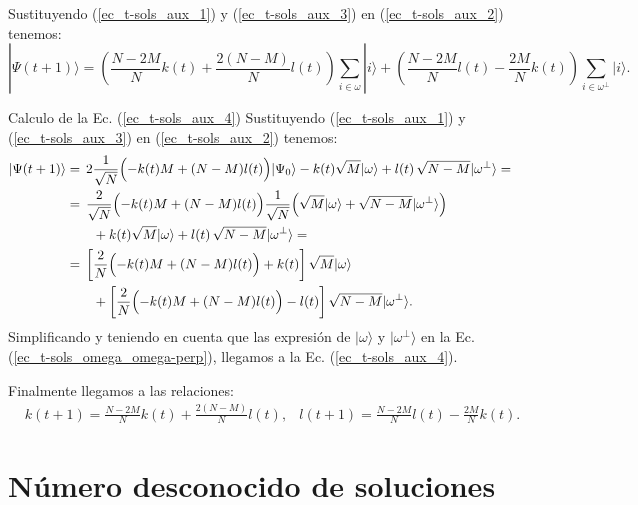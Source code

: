 \documentclass[a4paper,11pt]{article} %
\numberwithin{equation}{section}
\def\lp{\left(}
\def\rp{\right)}
\def\lc{\left[}
\def\rc{\right]}
\def\Lp{\Bigl(}
\def\Rp{\Bigr)}
\begin{document}
Sustituyendo (\ref{ec_t-sols_aux_1}) y (\ref{ec_t-sols_aux_3}) en (\ref{ec_t-sols_aux_2}) tenemos:
\begin{equation} \label{ec_t-sols_aux_4}
|\Psi(t+1) \rangle  = \lp \frac{N-2M}{N} k(t) + \frac{2(N-M)}{N} l(t) \rp \sum_{i \in \omega} | i \rangle + \lp \frac{N-2M}{N} l(t) - \frac{2M}{N} k(t) \rp \sum_{i \in \omega^{\perp}} | i \rangle.
\end{equation}
	
	\begin{mybox_green} {Calculo de la Ec. (\ref{ec_t-sols_aux_4})}
	Sustituyendo (\ref{ec_t-sols_aux_1}) y (\ref{ec_t-sols_aux_3}) en (\ref{ec_t-sols_aux_2}) tenemos:
	\begin{align*}
	|\Psi (t+1) \rangle & = 
	\, 2  \frac{1}{\sqrt{N}} \Lp -k(t) M + (N-M) l(t) \Rp | \Psi_0 \rangle 
	- k(t) \sqrt{M} |\omega \rangle +  l(t) \, \sqrt{N-M} | \omega^{\perp} \rangle  = \\
	& =  \, \frac{2}{\sqrt{N}} \Lp -k(t) M + (N-M) l(t) \Rp  \frac{1}{\sqrt{N}} \Lp \sqrt{M} | \omega \rangle + \sqrt{N-M} |\omega^{\perp} \rangle \Rp \\ 
	& \qquad + k(t) \sqrt{M} |\omega \rangle  +   l(t) \, \sqrt{N-M} | \omega^{\perp} \rangle = \\
	& =  \, \lc \frac{2}{N} \Lp -k(t) M + (N-M) l(t) \Rp + k(t) \rc \sqrt{M}  | \omega \rangle   \\
	& \qquad + \lc \frac{2}{N}  \Lp -k(t) M + (N-M) l(t) \Rp - l(t)  \rc \sqrt{N-M} | \omega^{\perp} \rangle.
	\end{align*}
	Simplificando y teniendo en cuenta que las expresión de $| \omega \rangle$ y $|\omega^{\perp} \rangle$ en la 
	Ec. (\ref{ec_t-sols_omega_omega-perp}), llegamos a la Ec. (\ref{ec_t-sols_aux_4}).
	\end{mybox_green}

Finalmente llegamos a las relaciones:
\begin{align} \label{ec_t-sols_k-l_j+1}
& \boxed{k(t+1) = \frac{N-2M}{N} k(t) + \frac{2(N-M)}{N} l(t)},
& \boxed{l(t+1) = \frac{N-2M}{N} l(t) - \frac{2M}{N}k(t)}.
\end{align}



\newpage
\section{Número desconocido de soluciones} \label{sec_t_no_conocido}
\end{document}
